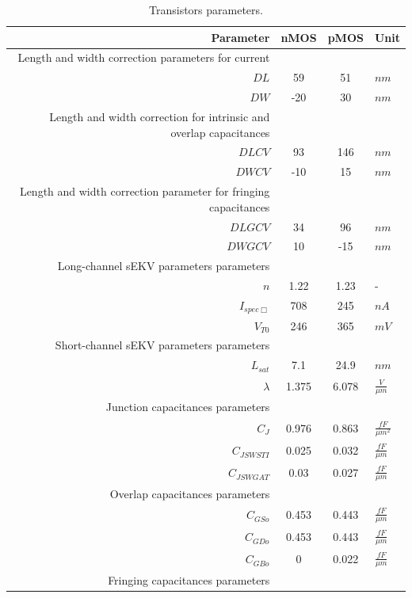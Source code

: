\documentclass[
  a4paper,
  DIV=11,
  numbers=noendperiod]{scrreprt}
\begin{document}
\begin{longtable}[]{@{}rccl@{}}

\caption{\label{tbl-mos_param}Transistors parameters.}

\tabularnewline

\toprule\noalign{}
Parameter & nMOS & pMOS & Unit \\
\midrule\noalign{}
\endhead
\bottomrule\noalign{}
\endlastfoot
Length and width correction parameters for current & & & \\
\(DL\) & 59 & 51 & \(nm\) \\
\(DW\) & -20 & 30 & \(nm\) \\
Length and width correction for intrinsic and overlap capacitances & &
& \\
\(DLCV\) & 93 & 146 & \(nm\) \\
\(DWCV\) & -10 & 15 & \(nm\) \\
Length and width correction parameter for fringing capacitances & & & \\
\(DLGCV\) & 34 & 96 & \(nm\) \\
\(DWGCV\) & 10 & -15 & \(nm\) \\
Long-channel sEKV parameters parameters & & & \\
\(n\) & 1.22 & 1.23 & - \\
\(I_{{spec\Box}}\) & 708 & 245 & \(nA\) \\
\(V_{{T0}}\) & 246 & 365 & \(mV\) \\
Short-channel sEKV parameters parameters & & & \\
\(L_{{sat}}\) & 7.1 & 24.9 & \(nm\) \\
\(\lambda\) & 1.375 & 6.078 & \(\frac{{V}}{{\mu m}}\) \\
Junction capacitances parameters & & & \\
\(C_J\) & 0.976 & 0.863 & \(\frac{{fF}}{{\mu m^2}}\) \\
\(C_{{JSWSTI}}\) & 0.025 & 0.032 & \(\frac{{fF}}{{\mu m}}\) \\
\(C_{{JSWGAT}}\) & 0.03 & 0.027 & \(\frac{{fF}}{{\mu m}}\) \\
Overlap capacitances parameters & & & \\
\(C_{{GSo}}\) & 0.453 & 0.443 & \(\frac{{fF}}{{\mu m}}\) \\
\(C_{{GDo}}\) & 0.453 & 0.443 & \(\frac{{fF}}{{\mu m}}\) \\
\(C_{{GBo}}\) & 0 & 0.022 & \(\frac{{fF}}{{\mu m}}\) \\
Fringing capacitances parameters & & & \\

\end{longtable}
\end{document}
